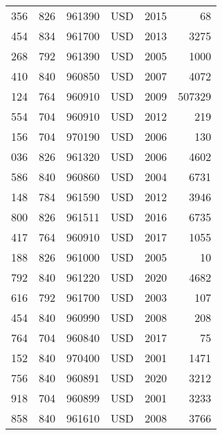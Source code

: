 {\begin{tabular}{lllllr}
 356 & 826 & 961390 & USD & 2015 & 68 \\
 454 & 834 & 961700 & USD & 2013 & 3275 \\
 268 & 792 & 961390 & USD & 2005 & 1000 \\
 410 & 840 & 960850 & USD & 2007 & 4072 \\
 124 & 764 & 960910 & USD & 2009 & 507329 \\
 554 & 704 & 960910 & USD & 2012 & 219 \\
 156 & 704 & 970190 & USD & 2006 & 130 \\
 036 & 826 & 961320 & USD & 2006 & 4602 \\
 586 & 840 & 960860 & USD & 2004 & 6731 \\
 148 & 784 & 961590 & USD & 2012 & 3946 \\
 800 & 826 & 961511 & USD & 2016 & 6735 \\
 417 & 764 & 960910 & USD & 2017 & 1055 \\
 188 & 826 & 961000 & USD & 2005 & 10 \\
 792 & 840 & 961220 & USD & 2020 & 4682 \\
 616 & 792 & 961700 & USD & 2003 & 107 \\
 454 & 840 & 960990 & USD & 2008 & 208 \\
 764 & 704 & 960840 & USD & 2017 & 75 \\
 152 & 840 & 970400 & USD & 2001 & 1471 \\
 756 & 840 & 960891 & USD & 2020 & 3212 \\
 918 & 704 & 960899 & USD & 2001 & 3233 \\
 858 & 840 & 961610 & USD & 2008 & 3766 \\
\bottomrule
\end{tabular}
}